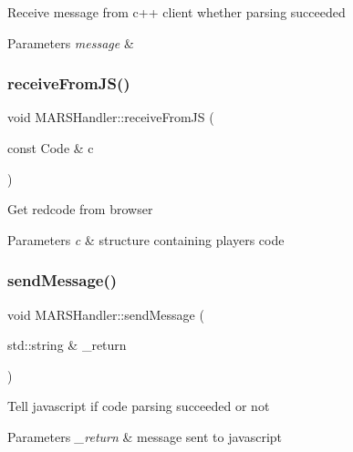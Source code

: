 Receive message from c++ client whether parsing succeeded 
\begin{DoxyParams}{Parameters}
{\em message} & \\
\hline
\end{DoxyParams}
\mbox{\label{classMARSHandler_aad361446a8dab85013f8eea681c95663}} 
\subsubsection{\texorpdfstring{receive\+From\+J\+S()}{receiveFromJS()}}
{\footnotesize\ttfamily void M\+A\+R\+S\+Handler\+::receive\+From\+JS (\begin{DoxyParamCaption}\item[{const Code \&}]{c }\end{DoxyParamCaption})\hspace{0.3cm}{\ttfamily [inline]}}

Get redcode from browser 
\begin{DoxyParams}{Parameters}
{\em c} & structure containing player\textquotesingle{}s code \\
\hline
\end{DoxyParams}
\mbox{\label{classMARSHandler_a59f960d2b59109d22eb25911284c167c}} 
\subsubsection{\texorpdfstring{send\+Message()}{sendMessage()}}
{\footnotesize\ttfamily void M\+A\+R\+S\+Handler\+::send\+Message (\begin{DoxyParamCaption}\item[{std\+::string \&}]{\+\_\+return }\end{DoxyParamCaption})\hspace{0.3cm}{\ttfamily [inline]}}

Tell javascript if code parsing succeeded or not 
\begin{DoxyParams}{Parameters}
{\em \+\_\+return} & message sent to javascript \\
\hline
\end{DoxyParams}
\mbox{\label{classMARSHandler_ac332bb9228000d1220fe80366fbccea4}} 
